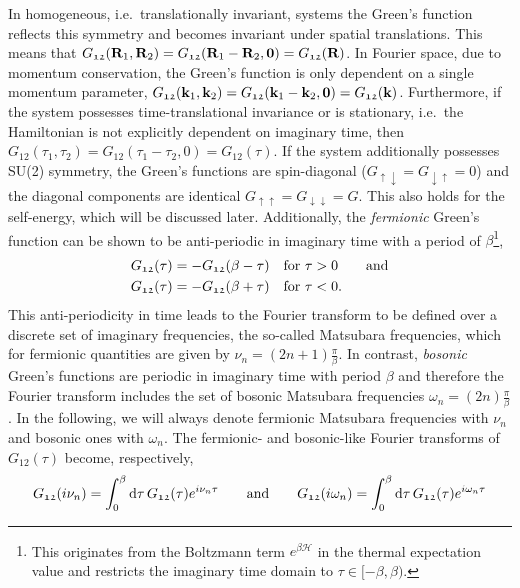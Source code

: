 \documentclass[../../main.tex]{subfiles}
\begin{document}
In homogeneous, i.e.\ translationally invariant, systems the Green's function reflects this symmetry and becomes invariant under spatial translations. This means that $G_{\mathfrak{12}}(\textbf{R}_1, \textbf{R}_2)=G_{\mathfrak{12}}(\textbf{R}_1-\textbf{R}_2,\textbf{0})=G_{\mathfrak{12}}(\textbf{R})$. In Fourier space, due to momentum conservation, the Green's function is only dependent on a single momentum parameter, $G_{\mathfrak{12}}(\textbf{k}_1, \textbf{k}_2)=G_{\mathfrak{12}}(\textbf{k}_1-\textbf{k}_2,\textbf{0})=G_{\mathfrak{12}}(\textbf{k})$. Furthermore, if the system possesses time-translational invariance or is stationary, i.e.\ the Hamiltonian is not explicitly dependent on imaginary time, then $G_{\mathfrak{12}}(\tau_1, \tau_2)=G_{\mathfrak{12}}(\tau_1-\tau_2,0)=G_{\mathfrak{12}}(\tau)$. If the system additionally possesses SU(2) symmetry, the Green's functions are spin-diagonal ($G_{\uparrow\downarrow}=G_{\downarrow\uparrow}=0$) and the diagonal components are identical $G_{\uparrow\uparrow}=G_{\downarrow\downarrow}=G$. This also holds for the self-energy, which will be discussed later. Additionally, the \textit{fermionic} Green's function can be shown to be anti-periodic in imaginary time with a period of $\beta$\footnote{This originates from the Boltzmann term $e^{\beta\hat{\mathcal{H}}}$ in the thermal expectation value and restricts the imaginary time domain to $\tau\in[-\beta,\beta)$.},
\begin{subequations}
\begin{align}
	G_{\mathfrak{12}}(\tau)&=-G_{\mathfrak{12}}(\beta-\tau)\quad\text{for } \tau>0 \qquad\text{and}\\
	G_{\mathfrak{12}}(\tau)&=-G_{\mathfrak{12}}(\beta+\tau)\quad\text{for } \tau<0.
\end{align}
\end{subequations}
This anti-periodicity in time leads to the Fourier transform to be defined over a discrete set of imaginary frequencies, the so-called Matsubara frequencies, which for fermionic quantities are given by $\nu_n=(2n+1)\frac\pi\beta$. In contrast, \textit{bosonic} Green's functions are periodic in imaginary time with period $\beta$ and therefore the Fourier transform includes the set of bosonic Matsubara frequencies $\omega_n=(2n)\frac\pi\beta$. In the following, we will always denote fermionic Matsubara frequencies with $\nu_n$ and bosonic ones with $\omega_n$. The fermionic- and bosonic-like Fourier transforms of $G_{\mathfrak{12}}(\tau)$ become, respectively,
\begin{align}
	G_{\mathfrak{12}}(i\nu_n)=\int_{0}^{\beta}\text{d}\tau\,G_{\mathfrak{12}}(\tau) e^{i\nu_n\tau} \qquad\text{and}\qquad G_{\mathfrak{12}}(i\omega_n)=\int_{0}^{\beta}\text{d}\tau\,G_{\mathfrak{12}}(\tau) e^{i\omega_n\tau}
\end{align}
\end{document}
